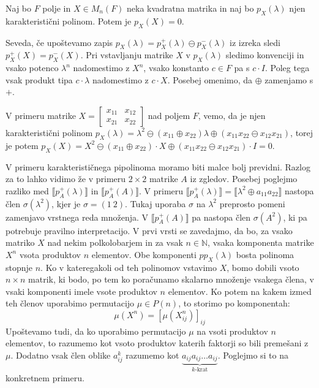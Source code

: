 \documentclass[mat1]{fmfdelo}
\newcommand{\N}{\mathbb{N}}
\begin{document}
\begin{izrek}
	Naj bo $F$ polje in $X\in M_n(F)$ neka kvadratna matrika in naj bo $p_X(\lambda)$ njen karakteristični polinom. Potem je $p_X(X) = 0$.
\end{izrek}

Seveda, če upoštevamo zapis $p_X(\lambda) = p_X^{+}(\lambda) \ominus p_X^{-}(\lambda)$ iz izreka sledi $p_X^{+}(X) = p_X^{-}(X)$. Pri vstavljanju matrike $X$ v $p_X(\lambda)$ sledimo konvenciji in vsako potenco $\lambda^n$ nadomestimo z $X^n$, vsako konstanto $c\in F$ pa s $c\cdot I$. Poleg tega vsak produkt tipa $c\cdot \lambda$ nadomestimo z $c\cdot X$. Posebej omenimo, da $\oplus$ zamenjamo s $+$.

V primeru matrike $X = \begin{bmatrix}
	x_{11} & x_{12} \\
	x_{21} & x_{22}
\end{bmatrix}$ nad poljem $F$, vemo, da je njen karakteristični polinom $p_X(\lambda) = \lambda^2 \ominus (x_{11} \oplus x_{22})\lambda \oplus (x_{11}x_{22} \ominus x_{12}x_{21})$, torej je potem $p_X(X) = X^2 \ominus (x_{11} \oplus x_{22})\cdot X \oplus (x_{11}x_{22} \ominus x_{12}x_{21})\cdot I = 0$. 

V primeru karakterističnega pipolinoma moramo biti malce bolj previdni. Razlog za to lahko vidimo že v primeru $2\times 2$ matrike $A$ iz zgledov. Posebej poglejmo razliko med $\llbracket p_A^{+}(\lambda)\rrbracket$ in $\llbracket p_A^{+}(A)\rrbracket$. V primeru $\llbracket p_A^{+}(\lambda) \rrbracket = \llbracket \lambda^2 \oplus a_{11}a_{22}\rrbracket$ nastopa člen $\sigma(\lambda^2)$, kjer je $\sigma = (1~2)$. Tukaj uporaba $\sigma$ na $\lambda^2$ preprosto pomeni zamenjavo vrstnega reda množenja. V $\llbracket p_A^{+}(A)\rrbracket$ pa nastopa člen $\sigma(A^2)$, ki pa potrebuje pravilno interpretacijo. V prvi vrsti se zavedajmo, da bo, za vsako matriko $X$ nad nekim polkolobarjem in za vsak $n\in\N$, vsaka komponenta matrike $X^n$ vsota produktov $n$ elementov. Obe komponenti $pp_X(\lambda)$ bosta polinoma stopnje $n$. Ko v kateregakoli od teh polinomov vstavimo $X$, bomo dobili vsoto $n\times n$ matrik, ki bodo, po tem ko poračunamo skalarno množenje vsakega člena, v vsaki komponenti imele vsote produktov $n$ elementov. Ko potem na kakem izmed teh členov uporabimo permutacijo $\mu\in P(n)$, to storimo po komponentah: $$\mu(X^n) = \left[\mu(X^n_{ij})\right]_{ij}$$ Upoštevamo tudi, da ko uporabimo permutacijo $\mu$ na vsoti produktov $n$ elementov, to razumemo kot vsoto produktov katerih faktorji so bili premešani z $\mu$. Dodatno vsak člen oblike $a_{ij}^k$ razumemo kot $\underbrace{a_{ij}a_{ij}\ldots a_{ij}}_{\text{$k$-krat}}$. Poglejmo si to na konkretnem primeru.
\end{document}
